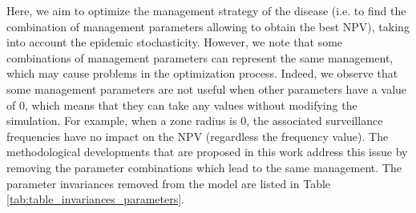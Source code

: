 Here, we aim to optimize the management strategy of the disease (i.e. to find the combination of management parameters allowing to obtain the best NPV), taking into account the epidemic stochasticity. However, we note that some combinations of management parameters can represent the same management, which may cause problems in the optimization process. Indeed, we observe that some management parameters are not useful when other parameters have a value of 0, which means that they can take any values without modifying the simulation. For example, when a zone radius is 0, the associated surveillance frequencies have no impact on the NPV (regardless the frequency value). The methodological developments that are proposed in this work address this issue by removing the parameter combinations which lead to the same management. The parameter invariances removed from the model are listed in Table \ref{tab:table_invariances_parameters}.


